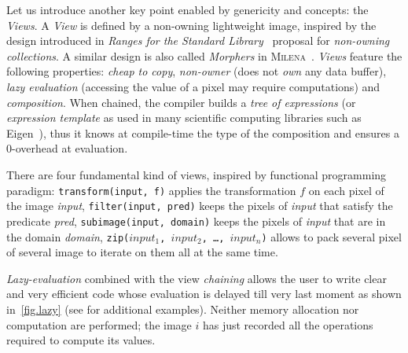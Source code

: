 Let us introduce another key point enabled by genericity and concepts: the \emph{Views}. A \emph{View} is defined by a
non-owning lightweight image, inspired by the design introduced in \emph{Ranges for the Standard
  Library}~\citep{niebler.2014.ranges} proposal for \emph{non-owning collections}. A similar design is also called
\emph{Morphers} in \textsc{Milena}~\citep{levillain.2009.ismm, geraud.2012.hdr}. \emph{Views} feature the following
properties: \emph{cheap to copy}, \emph{non-owner} (does not \emph{own} any data buffer), \emph{lazy evaluation}
(accessing the value of a pixel may require computations) and \emph{composition}. When chained, the compiler builds a
\emph{tree of expressions} (or \emph{expression template} as used in many scientific computing libraries such as
Eigen~\cite{guennebaud.2010.eigen}), thus it knows at compile-time the type of the composition and ensures a 0-overhead
at evaluation.

There are four fundamental kind of views, inspired by functional programming paradigm: \texttt{transform(input, f)}
applies the transformation $f$ on each pixel of the image \emph{input}, \texttt{filter(input, pred)} keeps the pixels of
\emph{input} that satisfy the predicate \emph{pred}, \texttt{subimage(input, domain)} keeps the pixels of \emph{input}
that are in the domain \emph{domain}, \texttt{zip($input_1$, $input_2$, \ldots, $input_n$)} allows to pack several pixel
of several image to iterate on them all at the same time.

\emph{Lazy-evaluation} combined with the view \emph{chaining} allows the user to write clear and very efficient code
whose evaluation is delayed till very last moment as shown in~\cref{fig.lazy} (see \cite{geraud.2018.gtgdmm} for
additional examples). Neither memory allocation nor computation are performed; the image $i$ has just recorded all the
operations required to compute its values.

